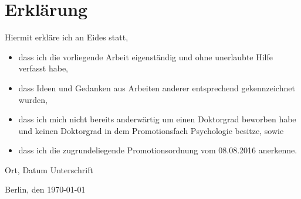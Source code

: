 
\chapter*{Erklärung}

 Hiermit erkläre ich an Eides statt,
 \begin{itemize}
\item dass ich die vorliegende Arbeit eigenständig und ohne unerlaubte Hilfe verfasst habe,
\item dass Ideen und Gedanken aus Arbeiten anderer entsprechend gekennzeichnet wurden,
\item dass ich mich nicht bereits anderwärtig um einen Doktorgrad beworben habe und keinen Doktorgrad in dem Promotionsfach Psychologie besitze, sowie
\item dass ich die zugrundeliegende Promotionsordnung vom 08.08.2016 anerkenne.
 \end{itemize}

	\vspace{3cm}


Ort, Datum					Unterschrift


	\vspace{3cm}

Berlin, den \today{}
